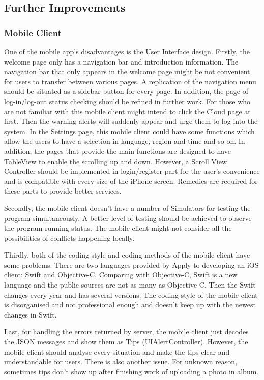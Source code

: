 \documentclass{article}
\begin{document}
\subsection{Further Improvements}
\subsubsection{Mobile Client}

One of the mobile app's disadvantages is the User Interface design. Firstly, the welcome page only has a navigation bar and introduction information. The navigation bar that only appears in the welcome page might be not convenient for users to transfer between various pages. A replication of the navigation menu should be situated as a sidebar button for every page. In addition, the page of log-in/log-out status checking should be refined in further work. For those who are not familiar with this mobile client might intend to click the Cloud page at first. Then the warning alerts will suddenly appear and urge them to log into the system. In the Settings page, this mobile client could have some functions which allow the users to have a selection in language, region and time and so on. In addition, the pages that provide the main functions are designed to have TableView to enable the scrolling up and down. However, a Scroll View Controller should be implemented in login/register part for the user's convenience and is compatible with every size of the iPhone screen. Remedies are required for these parts to provide better services.

Secondly, the mobile client doesn't have a number of Simulators for testing the program simultaneously. A better level of testing should be achieved to observe the program running status. The mobile client might not consider all the possibilities of conflicts happening locally.

Thirdly, both of the coding style and coding methods of the mobile client have some problems. There are two languages provided by Apply to developing an iOS client: Swift and Objective-C. Comparing with Objective-C, Swift is a new language and the public sources are not as many as Objective-C. Then the Swift changes every year and has several versions. The coding style of the mobile client is disorganised and not professional enough and doesn't keep up with the newest changes in Swift. 

Last, for handling the errors returned by server, the mobile client just decodes the JSON messages and show them as Tips (UIAlertController). However, the mobile client should analyse every situation and make the tips clear and understandable for users. There is also another issue. For unknown reason, sometimes tips don't show up after finishing work of uploading a photo in album.
\end{document}
